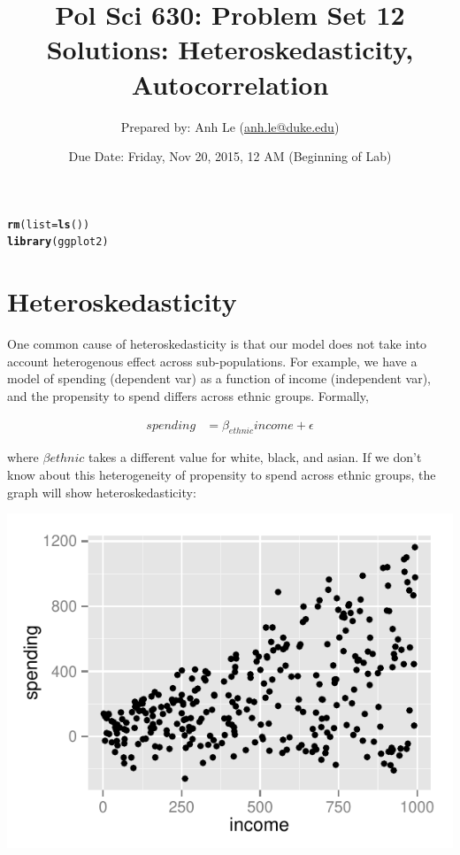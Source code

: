 \documentclass{article}\usepackage[]{graphicx}\usepackage[]{color}
\makeatletter
\def\maxwidth{ %
  \ifdim\Gin@nat@width>\linewidth
    \linewidth
  \else
    \Gin@nat@width
  \fi
}
\newcommand{\hlstd}[1]{\textcolor[rgb]{0.345,0.345,0.345}{#1}}%
\newcommand{\hlkwc}[1]{\textcolor[rgb]{0.333,0.667,0.333}{#1}}%
\newcommand{\hlkwd}[1]{\textcolor[rgb]{0.737,0.353,0.396}{\textbf{#1}}}%
\newenvironment{kframe}{%
 \def\at@end@of@kframe{}%
 \ifinner\ifhmode%
  \def\at@end@of@kframe{\end{minipage}}%
  \begin{minipage}{\columnwidth}%
 \fi\fi%
 \def\FrameCommand##1{\hskip\@totalleftmargin \hskip-\fboxsep
 \colorbox{shadecolor}{##1}\hskip-\fboxsep
     \hskip-\linewidth \hskip-\@totalleftmargin \hskip\columnwidth}%
 \MakeFramed {\advance\hsize-\width
   \@totalleftmargin\z@ \linewidth\hsize
   \@setminipage}}%
 {\par\unskip\endMakeFramed%
 \at@end@of@kframe}
\newenvironment{knitrout}{}{} %
\makeatother
\begin{document}
\title{Pol Sci 630:  Problem Set 12 Solutions: Heteroskedasticity, Autocorrelation}

\author{Prepared by: Anh Le (\href{mailto:anh.le@duke.edu}{anh.le@duke.edu})}

\date{Due Date: Friday, Nov 20, 2015, 12 AM (Beginning of Lab)}

\maketitle

\begin{knitrout}
\color{fgcolor}\begin{kframe}
\begin{alltt}
\hlkwd{rm}\hlstd{(}\hlkwc{list} \hlstd{=} \hlkwd{ls}\hlstd{())}
\hlkwd{library}\hlstd{(ggplot2)}
\end{alltt}
\end{kframe}
\end{knitrout}


\section{Heteroskedasticity}

One common cause of heteroskedasticity is that our model does not take into account heterogenous effect across sub-populations. For example, we have a model of spending (dependent var) as a function of income (independent var), and the propensity to spend differs across ethnic groups. Formally,

\begin{align}
spending &= \beta_{ethnic} income + \epsilon
\end{align}

where $\beta{ethnic}$ takes a different value for white, black, and asian. If we don't know about this heterogeneity of propensity to spend across ethnic groups, the graph will show heteroskedasticity:

\begin{knitrout}
\color{fgcolor}
\includegraphics[width=\maxwidth]{figure/unnamed-chunk-2-1} 

\end{knitrout}
\end{document}
